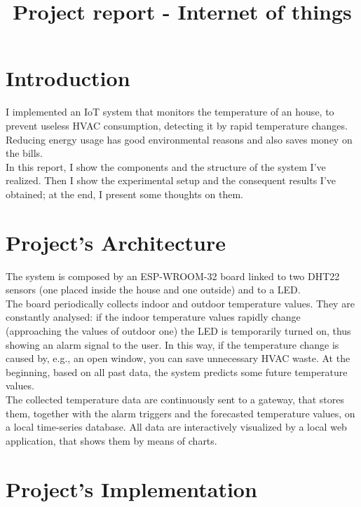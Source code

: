 \documentclass[conference]{IEEEtran}
\begin{document}
\title{Project report - Internet of things}

\author{
}

\maketitle


\section{Introduction}
I implemented an IoT system that monitors the temperature of an house, to prevent useless HVAC consumption, detecting it by rapid temperature changes. Reducing energy usage has good environmental reasons and also saves money on the bills.\\
In this report, I show the components and the structure of the system I've realized. Then I show the experimental setup and the consequent results I've obtained; at the end, I present some thoughts on them.


\section{Project’s Architecture}
The system is composed by an ESP-WROOM-32 board linked to two DHT22 sensors (one placed inside the house and one outside) and to a LED.\\
The board periodically collects indoor and outdoor temperature values. They are constantly analysed: if the indoor temperature values rapidly change (approaching the values of outdoor one) the LED is temporarily turned on, thus showing an alarm signal to the user. In this way, if the temperature change is caused by, e.g., an open window, you can save unnecessary HVAC waste. At the beginning, based on all past data, the system predicts some future temperature values.\\
The collected temperature data are continuously sent to a gateway, that stores them, together with the alarm triggers and the forecasted temperature values, on a local time-series database. All data are interactively visualized by a local web application, that shows them by means of charts.


\section{Project’s Implementation}
\end{document}
